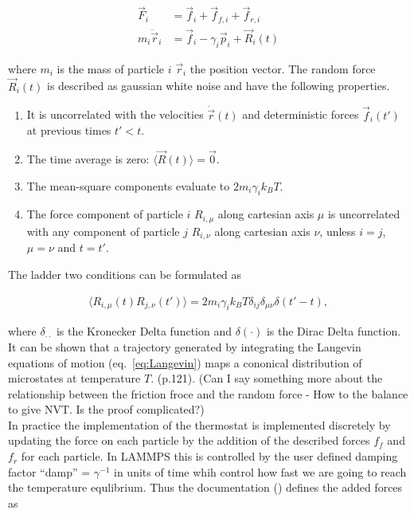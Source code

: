 \begin{align}
  \vec{F}_i &= \vec{f}_{i} + \vec{f}_{f,i} + \vec{f}_{r,i} \nonumber \\
  m_i \ddot{\vec{r}}_i &= \vec{f}_{i} - \gamma_i \vec{p}_i + \vec{R}_i(t)
  \label{eq:Langevin}
\end{align}

where $m_i$ is the mass of particle $i$ $\vec{r}_i$ the position vector. The random force $\vec{R}_i(t)$ is described as gaussian white noise and have the following properties. 

\begin{enumerate}
  \item It is uncorrelated with the velocities $\dot{\vec{r}}(t)$ and deterministic forces $\vec{f}_i(t')$ at previous times $t' < t$.
  \item The time average is zero: $\langle \vec{R}(t) \rangle = \vec{0}$.
  \item The mean-square components evaluate to $2m_i\gamma_i k_B T$.
  \item The force component of particle $i$ $R_{i,\mu}$ along cartesian axis $\mu$ is uncorrelated with any component of particle $j$ $R_{i,\nu}$ along cartesian axis $\nu$, unless $i=j$, $\mu=\nu$ and $t=t'$.
\end{enumerate}

The ladder two conditions can be formulated as

\begin{align*}
  \langle R_{i,\mu}(t) R_{j,\nu}(t') \rangle = 2m_i \gamma_i k_B T  \delta_{ij} \delta_{\mu\nu}\delta(t'-t),  
\end{align*}

where $\delta_{\cdot\cdot}$ is the Kronecker Delta function and $\delta(\cdot)$ is the Dirac Delta function. It can be shown that a trajectory generated by integrating the Langevin equations of motion (eq.~\eqref{eq:Langevin}) maps a cononical distribution of microstates at temperature $T$. \cite{Hunenberger2005}(p.121). (Can I say something more about the relationship between the friction froce and the random force - How to the balance to give NVT. Is the proof complicated?)\\

In practice the implementation of the thermostat is implemented discretely by updating the force on each particle by the addition of the described forces $f_f$ and $f_r$ for each particle. In LAMMPS this is controlled by the user defined damping factor ``damp'' = $\gamma^{-1}$ in units of time whih control how fast we are going to reach the temperature equlibrium. Thus the documentation (\cite{docs_lammps_langevin}) defines the added forces as

